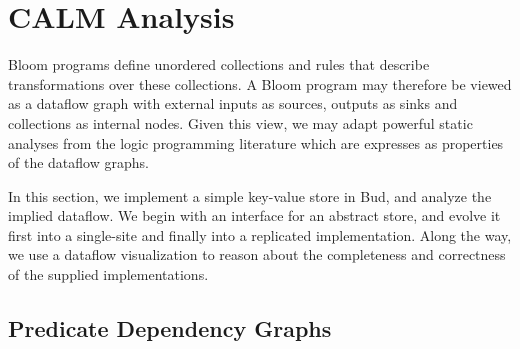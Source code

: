 \section{CALM Analysis}

Bloom programs define unordered collections and rules that describe transformations over 
these collections.  A Bloom program may therefore be viewed as a dataflow graph with external 
inputs as sources, outputs as sinks and collections as internal nodes.  Given this view,
we may adapt powerful static analyses from the logic programming literature which are 
expresses as properties of the dataflow graphs.

In this section, we implement a simple key-value store in Bud, and analyze the implied
dataflow.  We begin with an interface for an abstract store, and evolve it first into a single-site
and finally into a replicated implementation.  Along the way, we use a dataflow visualization
to reason about the completeness and correctness of the supplied implementations.

\subsection{Predicate Dependency Graphs}


